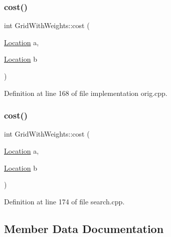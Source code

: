 \subsubsection{\texorpdfstring{cost()}{cost()}\hspace{0.1cm}{\footnotesize\ttfamily [1/2]}}
{\footnotesize\ttfamily int Grid\+With\+Weights\+::cost (\begin{DoxyParamCaption}\item[{\hyperlink{struct_square_grid_a2c9a2cbd3912aa48ac97289abc3f1c0f}{Location}}]{a,  }\item[{\hyperlink{struct_square_grid_a2c9a2cbd3912aa48ac97289abc3f1c0f}{Location}}]{b }\end{DoxyParamCaption})\hspace{0.3cm}{\ttfamily [inline]}}



Definition at line 168 of file implementation orig.\+cpp.

\mbox{\label{struct_grid_with_weights_a999c39922a9b507e4436b817592a7ff9}} 
\subsubsection{\texorpdfstring{cost()}{cost()}\hspace{0.1cm}{\footnotesize\ttfamily [2/2]}}
{\footnotesize\ttfamily int Grid\+With\+Weights\+::cost (\begin{DoxyParamCaption}\item[{\hyperlink{struct_square_grid_a2c9a2cbd3912aa48ac97289abc3f1c0f}{Location}}]{a,  }\item[{\hyperlink{struct_square_grid_a2c9a2cbd3912aa48ac97289abc3f1c0f}{Location}}]{b }\end{DoxyParamCaption})\hspace{0.3cm}{\ttfamily [inline]}}



Definition at line 174 of file search.\+cpp.



\subsection{Member Data Documentation}
\mbox{\label{struct_grid_with_weights_a03137c824b8c63cdeed414ef40f5b504}} 
